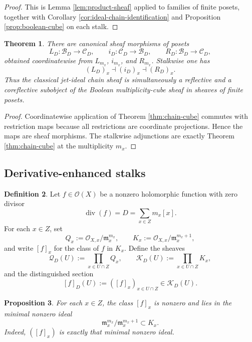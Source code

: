 \documentclass[11pt,a4paper]{article}
\newtheorem{theorem}{Theorem}[section]
\newtheorem{proposition}[theorem]{Proposition}
\theoremstyle{definition}
\newtheorem{definition}[theorem]{Definition}
\theoremstyle{remark}
\newcommand{\cO}{\mathcal O}
\newcommand{\cQ}{\mathcal Q}
\newcommand{\cK}{\mathcal K}
\newcommand{\cB}{\mathcal B}
\newcommand{\cC}{\mathcal C}
\begin{document}
\begin{proof}
This is Lemma \ref{lem:product-sheaf} applied to families of finite posets, together with Corollary \ref{cor:ideal-chain-identification} and Proposition \ref{prop:boolean-cube} on each stalk.
\end{proof}

\begin{theorem}\label{thm:sheafified-chain-cube}
There are canonical sheaf morphisms of posets
\[
L_D:\cB_D\to\cC_D,
\qquad
i_D:\cC_D\to\cB_D,
\qquad
R_D:\cB_D\to\cC_D,
\]
obtained coordinatewise from $L_{m_x}$, $i_{m_x}$, and $R_{m_x}$.  Stalkwise one has
\[
(L_D)_x\dashv (i_D)_x\dashv (R_D)_x.
\]
Thus the classical jet-ideal chain sheaf is simultaneously a reflective and a coreflective subobject of the Boolean multiplicity-cube sheaf in sheaves of finite posets.
\end{theorem}

\begin{proof}
Coordinatewise application of Theorem \ref{thm:chain-cube} commutes with restriction maps because all restrictions are coordinate projections.  Hence the maps are sheaf morphisms.  The stalkwise adjunctions are exactly Theorem \ref{thm:chain-cube} at the multiplicity $m_x$.
\end{proof}

\subsection{Derivative-enhanced stalks}

\begin{definition}
Let $f\in\cO(X)$ be a nonzero holomorphic function with zero divisor
\[
\operatorname{div}(f)=D=\sum_{x\in Z}m_x[x].
\]
For each $x\in Z$, set
\[
Q_x:=\cO_{X,x}/\mathfrak m_x^{m_x},
\qquad
K_x:=\cO_{X,x}/\mathfrak m_x^{m_x+1},
\]
and write $[f]_x$ for the class of $f$ in $K_x$.
Define the sheaves
\[
\cQ_D(U):=\prod_{x\in U\cap Z}Q_x,
\qquad
\cK_D(U):=\prod_{x\in U\cap Z}K_x,
\]
and the distinguished section
\[
[f]_D(U):=([f]_x)_{x\in U\cap Z}\in \cK_D(U).
\]
\end{definition}

\begin{proposition}\label{prop:derivative-enhanced-local}
For each $x\in Z$, the class $[f]_x$ is nonzero and lies in the minimal nonzero ideal
\[
\mathfrak m_x^{m_x}/\mathfrak m_x^{m_x+1}\subset K_x.
\]
Indeed, $([f]_x)$ is exactly that minimal nonzero ideal.
\end{proposition}
\end{document}
